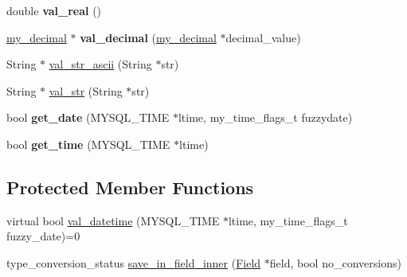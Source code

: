 \begin{DoxyCompactItemize}
double {\bfseries val\+\_\+real} ()
\item 
\mbox{\label{classItem__temporal__hybrid__func_a173136e8530c4850620325e5ecd4f0b8}} 
\mbox{\hyperlink{classmy__decimal}{my\+\_\+decimal}} $\ast$ {\bfseries val\+\_\+decimal} (\mbox{\hyperlink{classmy__decimal}{my\+\_\+decimal}} $\ast$decimal\+\_\+value)
\item 
String $\ast$ \mbox{\hyperlink{classItem__temporal__hybrid__func_a2ba0d9df935afd9e69e05018dd9e0cfc}{val\+\_\+str\+\_\+ascii}} (String $\ast$str)
\item 
String $\ast$ \mbox{\hyperlink{classItem__temporal__hybrid__func_a0ccf9288d8a2da3a7820448281046170}{val\+\_\+str}} (String $\ast$str)
\item 
\mbox{\label{classItem__temporal__hybrid__func_ac1157eaf2df1af5e4909117145fadb7c}} 
bool {\bfseries get\+\_\+date} (M\+Y\+S\+Q\+L\+\_\+\+T\+I\+ME $\ast$ltime, my\+\_\+time\+\_\+flags\+\_\+t fuzzydate)
\item 
\mbox{\label{classItem__temporal__hybrid__func_a9e7f893bda6f47aaf661c455aebaa734}} 
bool {\bfseries get\+\_\+time} (M\+Y\+S\+Q\+L\+\_\+\+T\+I\+ME $\ast$ltime)
\end{DoxyCompactItemize}
\subsection*{Protected Member Functions}
\begin{DoxyCompactItemize}
\item 
virtual bool \mbox{\hyperlink{classItem__temporal__hybrid__func_a6c18c127a5bf91544f68f303aa96dad4}{val\+\_\+datetime}} (M\+Y\+S\+Q\+L\+\_\+\+T\+I\+ME $\ast$ltime, my\+\_\+time\+\_\+flags\+\_\+t fuzzy\+\_\+date)=0
\item 
type\+\_\+conversion\+\_\+status \mbox{\hyperlink{classItem__temporal__hybrid__func_a3f3134574bdb6dd08a1cdd7078806368}{save\+\_\+in\+\_\+field\+\_\+inner}} (\mbox{\hyperlink{classField}{Field}} $\ast$field, bool no\+\_\+conversions)
\end{DoxyCompactItemize}
